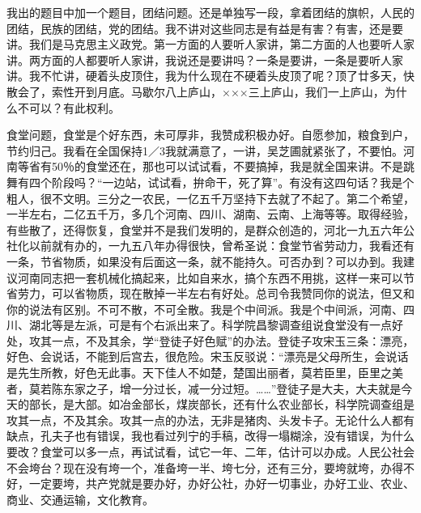 我出的题目中加一个题目，团结问题。还是单独写一段，拿着团结的旗帜，人民的团结，民族的团结，党的团结。我不讲对这些同志是有益是有害？有害，还是要讲。我们是马克思主义政党。第一方面的人要听人家讲，第二方面的人也要听人家讲。两方面的人都要听人家讲，我说还是要讲吗？一条是要讲，一条是要听人家讲。我不忙讲，硬着头皮顶住，我为什么现在不硬着头皮顶了呢？顶了廿多天，快散会了，索性开到月底。马歇尔八上庐山，×××三上庐山，我们一上庐山，为什么不可以？有此权利。

食堂问题，食堂是个好东西，未可厚非，我赞成积极办好。自愿参加，粮食到户，节约归己。我看在全国保持1／3我就满意了，一讲，吴芝圃就紧张了，不要怕。河南等省有50％的食堂还在，那也可以试试看，不要搞掉，我是就全国来讲。不是跳舞有四个阶段吗？“一边站，试试看，拚命干，死了算”。有没有这四句话？我是个粗人，很不文明。三分之一农民，一亿五千万坚持下去就了不起了。第二个希望，一半左右，二亿五千万，多几个河南、四川、湖南、云南、上海等等。取得经验，有些散了，还得恢复，食堂并不是我们发明的，是群众创造的，河北一九五六年公社化以前就有办的，一九五八年办得很快，曾希圣说：食堂节省劳动力，我看还有一条，节省物质，如果没有后面这一条，就不能持久。可否办到？可以办到。我建议河南同志把一套机械化搞起来，比如自来水，搞个东西不用挑，这样一来可以节省劳力，可以省物质，现在散掉一半左右有好处。总司令我赞同你的说法，但又和你的说法有区别。不可不散，不可全散。我是个中间派。我是个中间派，河南、四川、湖北等是左派，可是有个右派出来了。科学院昌黎调查组说食堂没有一点好处，攻其一点，不及其余，学“登徒子好色赋”的办法。登徒子攻宋玉三条：漂亮，好色、会说话，不能到后宫去，很危险。宋玉反驳说：“漂亮是父母所生，会说话是先生所教，好色无此事。天下佳人不如楚，楚国出丽者，莫若臣里，臣里之美者，莫若陈东家之子，增一分过长，减一分过短。……”登徒子是大夫，大夫就是今天的部长，是大部。如冶金部长，煤炭部长，还有什么农业部长，科学院调查组是攻其一点，不及其余。攻其一点的办法，无非是猪肉、头发卡子。无论什么人都有缺点，孔夫子也有错误，我也看过列宁的手稿，改得一塌糊涂，没有错误，为什么要改？食堂可以多一点，再试试看，试它一年、二年，估计可以办成。人民公社会不会垮台？现在没有垮一个，准备垮一半、垮七分，还有三分，要垮就垮，办得不好，一定要垮，共产党就是要办好，办好公社，办好一切事业，办好工业、农业、商业、交通运输，文化教育。

